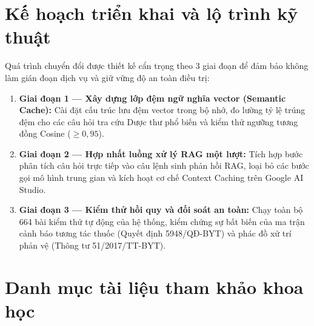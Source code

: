 \documentclass[12pt,a4paper]{article}
\begin{document}
\section{Kế hoạch triển khai và lộ trình kỹ thuật}

Quá trình chuyển đổi được thiết kế cẩn trọng theo 3 giai đoạn để đảm bảo không làm gián đoạn dịch vụ và giữ vững độ an toàn điều trị:

\begin{enumerate}[leftmargin=1.5em]
    \item \textbf{Giai đoạn 1 --- Xây dựng lớp đệm ngữ nghĩa vector (Semantic Cache):} Cài đặt cấu trúc lưu đệm vector trong bộ nhớ, đo lường tỷ lệ trúng đệm cho các câu hỏi tra cứu Dược thư phổ biến và kiểm thử ngưỡng tương đồng Cosine ($\ge 0,95$).
    \item \textbf{Giai đoạn 2 --- Hợp nhất luồng xử lý RAG một lượt:} Tích hợp bước phân tích câu hỏi trực tiếp vào câu lệnh sinh phản hồi RAG, loại bỏ các bước gọi mô hình trung gian và kích hoạt cơ chế Context Caching trên Google AI Studio.
    \item \textbf{Giai đoạn 3 --- Kiểm thử hồi quy và đối soát an toàn:} Chạy toàn bộ 664 bài kiểm thử tự động của hệ thống, kiểm chứng sự bất biến của ma trận cảnh báo tương tác thuốc (Quyết định 5948/QĐ-BYT) và phác đồ xử trí phản vệ (Thông tư 51/2017/TT-BYT).
\end{enumerate}

\section{Danh mục tài liệu tham khảo khoa học}
\end{document}
